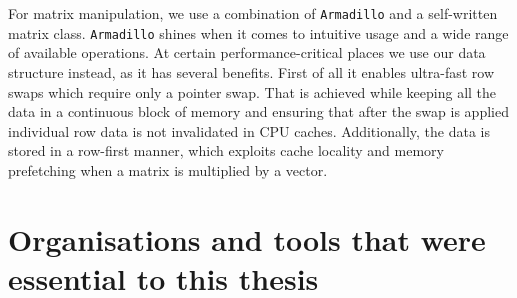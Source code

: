 \documentclass[11pt,a4paper]{article}
\begin{document}
\begin{appendices}
    For matrix manipulation, we use a combination of \texttt{Armadillo}\cite{Sanderson10} and a self-written matrix class.
    \texttt{Armadillo} shines when it comes to intuitive usage and a wide range of available operations.
    At certain performance-critical places we use our data structure instead, as it has several benefits.
    First of all it enables ultra-fast row swaps which require only a pointer swap.
    That is achieved while keeping all the data in a continuous block of memory and ensuring that after the swap is applied individual row data is not invalidated in CPU caches.
    Additionally, the data is stored in a row-first manner, which exploits cache locality and memory prefetching when a matrix is multiplied by a vector.

    \section{Organisations and tools that were essential to this thesis}


\end{appendices}
\end{document}
